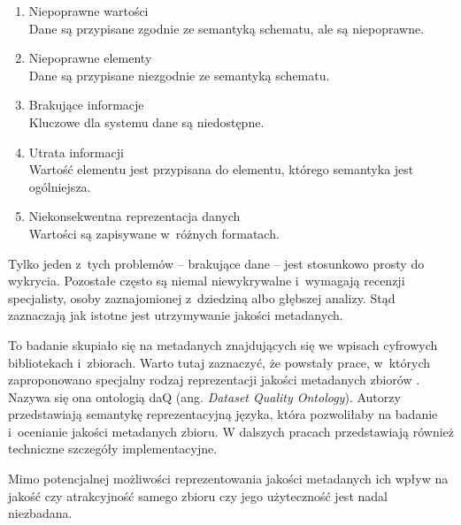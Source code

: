 	\begin{enumerate}
		\item Niepoprawne wartości \\
		Dane są przypisane zgodnie ze semantyką schematu, ale są niepoprawne.

		\item Niepoprawne elementy \\
		Dane są przypisane niezgodnie ze semantyką schematu.

		\item Brakujące informacje \\
		Kluczowe dla systemu dane są niedostępne.

		\item Utrata informacji \\
		Wartość elementu jest przypisana do elementu, którego semantyka jest ogólniejsza.

		\item Niekonsekwentna reprezentacja danych \\
		Wartości są zapisywane w~różnych formatach.
	\end{enumerate}

	Tylko jeden z~tych problemów -- brakujące dane -- jest stosunkowo prosty do wykrycia.
	Pozostałe często są niemal niewykrywalne i~wymagają recenzji specjalisty, osoby zaznajomionej z~dziedziną albo głębszej analizy.
	Stąd zaznaczają jak istotne jest utrzymywanie jakości metadanych.

	To badanie skupiało się na metadanych znajdujących się we wpisach cyfrowych bibliotekach i~zbiorach.
	Warto tutaj zaznaczyć, że powstały prace, w~których zaproponowano specjalny rodzaj reprezentacji jakości metadanych zbiorów \cite{debattista2014daq}.
	Nazywa się ona ontologią daQ (ang. \emph{Dataset Quality Ontology}).
	Autorzy przedstawiają semantykę reprezentacyjną języka, która pozwoliłaby na badanie i~ocenianie jakości metadanych zbioru.
	W dalszych pracach \cite{debattista2014representing} przedstawiają również techniczne szczegóły implementacyjne.

	Mimo potencjalnej możliwości reprezentowania jakości metadanych ich wpływ na jakość czy atrakcyjność samego zbioru czy jego użyteczność jest nadal niezbadana.
